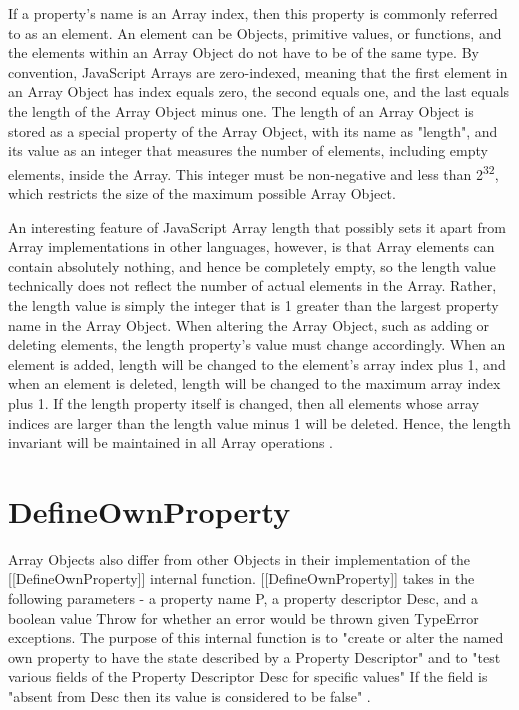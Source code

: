 \documentclass[a4paper,11pt,twoside]{report}
\begin{document}
If a property's name is an Array index, then this property is commonly referred to as an element. An element can be Objects, primitive values, or functions, and the elements within an Array Object do not have to be of the same type. By convention, JavaScript Arrays are zero-indexed, meaning that the first element in an Array Object has index equals zero, the second equals one, and the last equals the length of the Array Object minus one. The length of an Array Object is stored as a special property of the Array Object, with its name as "length", and its value as an integer that measures the number of elements, including empty elements, inside the Array. This integer must be non-negative and less than 2\textsuperscript{32}, which restricts the size of the maximum possible Array Object. 

An interesting feature of JavaScript Array length that possibly sets it apart from Array implementations in other languages, however, is that Array elements can contain absolutely nothing, and hence be completely empty, so the length value technically does not reflect the number of actual elements in the Array. Rather, the length value is simply the integer that is 1 greater than the largest property name in the Array Object. When altering the Array Object, such as adding or deleting elements, the length property's value must change accordingly. When an element is added, length will be changed to the element's array index plus 1, and when an element is deleted, length will be changed to the maximum array index plus 1. If the length property itself is changed, then all elements whose array indices are larger than the length value minus 1 will be deleted. Hence, the length invariant will be maintained in all Array operations \cite{EcmaScript}.

\section{DefineOwnProperty}
Array Objects also differ from other Objects in their implementation of the [[DefineOwnProperty]] internal function. [[DefineOwnProperty]] takes in the following parameters - a property name P, a property descriptor Desc, and a boolean value Throw for whether an error would be thrown given TypeError exceptions. The purpose of this internal function is to "create or alter the named own property to have the state described by a Property Descriptor" and to "test various fields of the Property Descriptor Desc for specific values" If the field is "absent from Desc then its value is considered to be false" \cite{EcmaScript}. 
\end{document}
